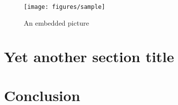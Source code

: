 \documentclass{cseminar}
\begin{document}
\begin{figure}[t]
  \begin{center}
    \texttt{[image: figures/sample]}
    \caption{An embedded picture}
    \label{fig:mypicture1}
  \end{center}
\end{figure}




\section{Yet another section title}




\section{Conclusion}





\fi

\end{document}
